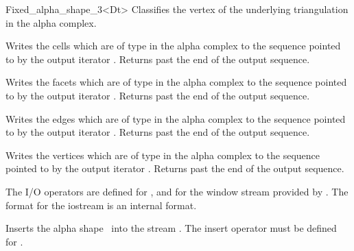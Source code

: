\begin{ccRefClass} {Fixed_alpha_shape_3<Dt>}
{Classifies the vertex  of the underlying triangulation in the alpha complex.}



{Writes the cells which are of type  in the alpha complex
to the sequence
pointed to by the output iterator . Returns past the end
of the output sequence.}


{Writes the facets which are of type  in the alpha complex
to the sequence pointed to by the output iterator . Returns past the end
of the output sequence.}

{Writes the edges which are of type  in the alpha complex 
to the sequence
pointed to by the output iterator . Returns past the end
of the output sequence.}

{Writes the vertices which are of type  in the alpha complex
to the sequence pointed to by the output iterator . Returns past the end
of the output sequence.}


The I/O operators are defined for , and for
the window stream provided by \cgal. The format for the iostream
is an internal format. 


{Inserts the alpha shape \ccVar\ into the stream .
\ccRequire The insert operator must be defined for .}



\end{ccRefClass}

